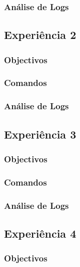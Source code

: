 \documentclass[a4paper,11pt]{article}
\begin{document}
\subsubsection{Análise de Logs}

\subsection{Experiência 2}
\subsubsection{Objectivos}

\subsubsection{Comandos}

\subsubsection{Análise de Logs}

\subsection{Experiência 3}
\subsubsection{Objectivos}

\subsubsection{Comandos}

\subsubsection{Análise de Logs}

\subsection{Experiência 4}
\subsubsection{Objectivos}
\end{document}

